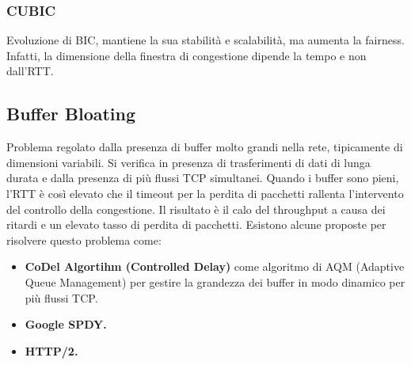\subsubsection{CUBIC}
Evoluzione di BIC, mantiene la sua stabilità e scalabilità, ma aumenta la fairness. Infatti, la dimensione della finestra di congestione dipende la tempo e non dall'RTT.

\subsection{Buffer Bloating}
Problema regolato dalla presenza di buffer molto grandi nella rete, tipicamente di dimensioni variabili. Si verifica in presenza di trasferimenti di dati di lunga durata e dalla presenza di più flussi TCP simultanei. Quando i buffer sono pieni, l'RTT è così elevato che il timeout per la perdita di pacchetti rallenta l'intervento del controllo della congestione. Il risultato è il calo del throughput a causa dei ritardi e un elevato tasso di perdita di pacchetti.
Esistono alcune proposte per risolvere questo problema come:
\begin{itemize}
    \item \textbf{CoDel Algortihm (Controlled Delay)} come algoritmo di AQM (Adaptive Queue Management) per gestire la grandezza dei buffer in modo dinamico per più flussi TCP.
    \item \textbf{Google SPDY.}
    \item \textbf{HTTP/2.}
\end{itemize}
